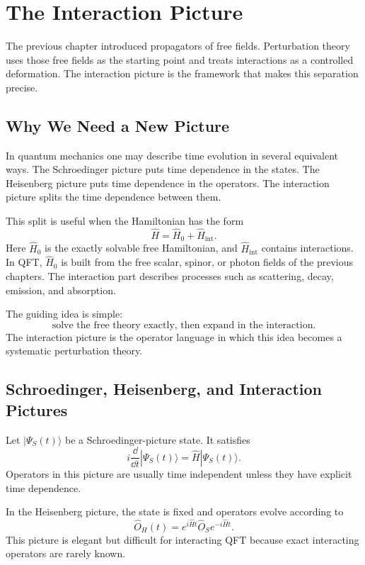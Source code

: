 \chapter{The Interaction Picture}

\begin{remarkbox}
The previous chapter introduced propagators of free fields. Perturbation theory
uses those free fields as the starting point and treats interactions as a
controlled deformation. The interaction picture is the framework that makes this
separation precise.
\end{remarkbox}

\section{Why We Need a New Picture}

In quantum mechanics one may describe time evolution in several equivalent ways.
The Schroedinger picture puts time dependence in the states. The Heisenberg
picture puts time dependence in the operators. The interaction picture splits
the time dependence between them.

This split is useful when the Hamiltonian has the form
\[
    \hat H = \hat H_0 + \hat H_{\mathrm{int}}.
\]
Here \(\hat H_0\) is the exactly solvable free Hamiltonian, and
\(\hat H_{\mathrm{int}}\) contains interactions. In QFT, \(\hat H_0\) is built
from the free scalar, spinor, or photon fields of the previous chapters. The
interaction part describes processes such as scattering, decay, emission, and
absorption.

The guiding idea is simple:
\[
    \text{solve the free theory exactly, then expand in the interaction}.
\]
The interaction picture is the operator language in which this idea becomes a
systematic perturbation theory.

\section{Schroedinger, Heisenberg, and Interaction Pictures}

Let \(|\Psi_S(t)\rangle\) be a Schroedinger-picture state. It satisfies
\[
    i\frac{\dd}{\dd t}|\Psi_S(t)\rangle
    = \hat H|\Psi_S(t)\rangle.
\]
Operators in this picture are usually time independent unless they have explicit
time dependence.

In the Heisenberg picture, the state is fixed and operators evolve according to
\[
    \hat O_H(t)
    = e^{i\hat H t}\hat O_S e^{-i\hat H t}.
\]
This picture is elegant but difficult for interacting QFT because exact
interacting operators are rarely known.

